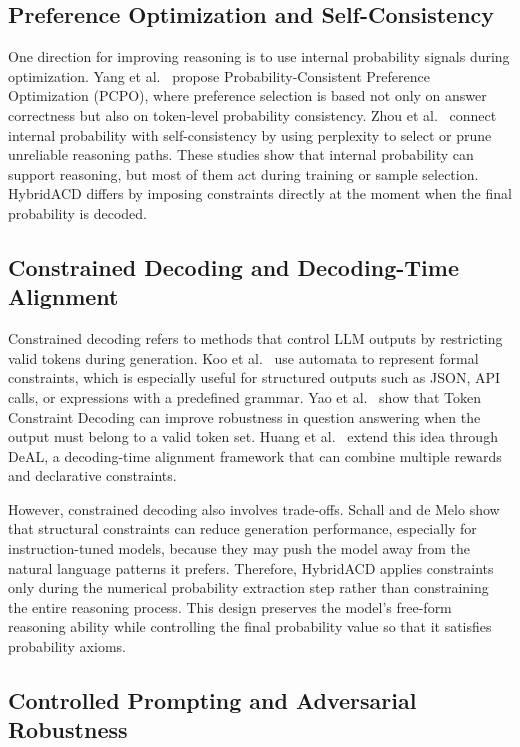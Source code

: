 \documentclass[pdflatex,sn-mathphys-num]{sn-jnl}
\begin{document}
\subsection{Preference Optimization and Self-Consistency}

One direction for improving reasoning is to use internal probability signals during optimization. Yang et al.\ \cite{ref3} propose Probability-Consistent Preference Optimization (PCPO), where preference selection is based not only on answer correctness but also on token-level probability consistency. Zhou et al.\ \cite{ref6} connect internal probability with self-consistency by using perplexity to select or prune unreliable reasoning paths. These studies show that internal probability can support reasoning, but most of them act during training or sample selection. HybridACD differs by imposing constraints directly at the moment when the final probability is decoded.

\subsection{Constrained Decoding and Decoding-Time Alignment}

Constrained decoding refers to methods that control LLM outputs by restricting valid tokens during generation. Koo et al.\ \cite{ref7} use automata to represent formal constraints, which is especially useful for structured outputs such as JSON, API calls, or expressions with a predefined grammar. Yao et al.\ \cite{ref9} show that Token Constraint Decoding can improve robustness in question answering when the output must belong to a valid token set. Huang et al.\ \cite{ref11} extend this idea through DeAL, a decoding-time alignment framework that can combine multiple rewards and declarative constraints.

However, constrained decoding also involves trade-offs. Schall and de Melo \cite{ref10} show that structural constraints can reduce generation performance, especially for instruction-tuned models, because they may push the model away from the natural language patterns it prefers. Therefore, HybridACD applies constraints only during the numerical probability extraction step rather than constraining the entire reasoning process. This design preserves the model's free-form reasoning ability while controlling the final probability value so that it satisfies probability axioms.

\subsection{Controlled Prompting and Adversarial Robustness}
\end{document}
